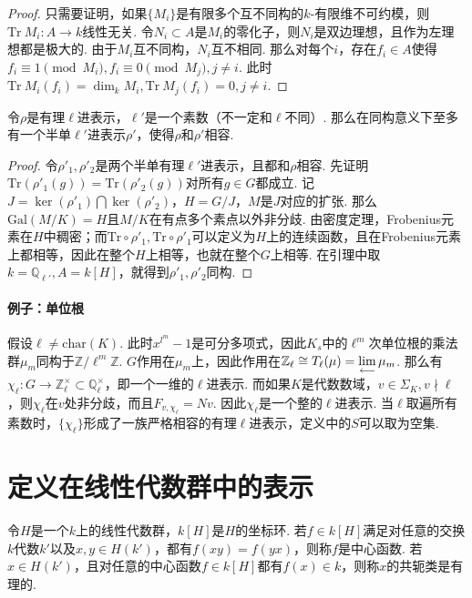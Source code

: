\begin{proof}
    只需要证明，如果$\{M_i\}$是有限多个互不同构的$k$-有限维不可约模，则$\mathrm{Tr}\ M_i: A\to k$线性无关. 令$N_i\subset A$是$M_i$的零化子，则$N_i$是双边理想，且作为左理想都是极大的. 由于$M_i$互不同构，$N_i$互不相同. 那么对每个$i$，存在$f_i\in A$使得$f_i\equiv 1\pmod{M_i}, f_i\equiv 0\pmod{M_j}, j\neq i$. 此时$\mathrm{Tr}\ M_i(f_i) = \dim_k M_i, \mathrm{Tr}\ M_j(f_i) = 0, j\neq i$.
\end{proof}

\begin{cthm}
    令$\rho$是有理$\ell$进表示，$\ell'$是一个素数（不一定和$\ell$不同）. 那么在同构意义下至多有一个半单$\ell'$进表示$\rho'$，使得$\rho$和$\rho'$相容.
\end{cthm}

\begin{proof}
    令$\rho'_1, \rho'_2$是两个半单有理$\ell'$进表示，且都和$\rho$相容. 先证明$\mathrm{Tr}(\rho'_1(g)) = \mathrm{Tr}(\rho'_2(g))$对所有$g\in G$都成立. 记$J = \ker(\rho'_1)\bigcap \ker(\rho'_2)$，$H = G/J$，$M$是$J$对应的扩张. 那么$\mathrm{Gal}(M/K) = H$且$M/K$在有点多个素点以外非分歧. 由\Chebotarev 密度定理，Frobenius元素在$H$中稠密；而$\mathrm{Tr}\circ \rho'_1, \mathrm{Tr}\circ \rho'_1$可以定义为$H$上的连续函数，且在Frobenius元素上都相等，因此在整个$H$上相等，也就在整个$G$上相等. 在引理中取$k = \mathbb{Q}_{\ell'}, A = k[H]$，就得到$\rho'_1, \rho'_2$同构.
\end{proof}

\paragraph{例子：单位根}
假设$\ell\neq \mathrm{char}(K)$. 此时$x^{l^m}-1$是可分多项式，因此$K_s$中的$\ell^m$次单位根的乘法群$\mu_m$同构于$\mathbb{Z}/\ell^m \mathbb{Z}$. $G$作用在$\mu_m$上，因此作用在$\mathbb{Z}_{\ell} \cong T_{\ell}(\mu) = \lim\limits_{\longleftarrow}\mu_m$. 那么有$\chi_{\ell}:G\to \mathbb{Z}_{\ell}^{\times}\subset \mathbb{Q}_{\ell}^{\times}$，即一个一维的$\ell$进表示. 而如果$K$是代数数域，$v\in \Sigma_K, v\nmid \ell$，则$\chi_{\ell}$在$v$处非分歧，而且$F_{v, \chi_{\ell}} = Nv$. 因此$\chi_{\ell}$是一个整的$\ell$进表示. 当$\ell$取遍所有素数时，$\{\chi_{\ell}\}$形成了一族严格相容的有理$\ell$进表示，定义中的$S$可以取为空集.

\section{定义在线性代数群中的表示}

\begin{cdef}
    令$H$是一个$k$上的线性代数群，$k[H]$是$H$的坐标环. 若$f\in k[H]$满足对任意的交换$k$代数$k'$以及$x,y\in H(k')$，都有$f(xy)=f(yx)$，则称$f$是中心函数. 若$x\in H(k')$，且对任意的中心函数$f\in k[H]$都有$f(x)\in k$，则称$x$的共轭类是有理的.
\end{cdef}

